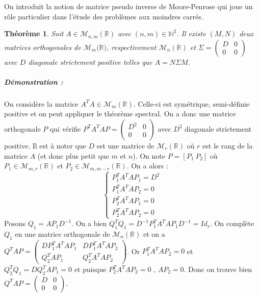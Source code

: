 \documentclass[10pt,a4paper]{article}
\newtheorem{thm}{Théorème}
\begin{document}
On introduit la notion de matrice pseudo inverse de Moore-Penrose \cite{penrose1955generalized} qui joue un rôle particulier dans l'étude des problèmes aux moindres carrés.
\begin{thm}
Soit $A \in \mathcal{M}_{n,m}(\mathbb{R})$ avec $(n,m) \in \mathbb{N}^2$.
Il existe $(M,N)$ deux matrices orthogonales de $\mathcal{M}_m(\mathbb{R)}$, respectivement $\mathcal{M}_n(\mathbb{R})$ et $\Sigma=\left( \begin{matrix}
D & 0 \\ 0 & 0
\end{matrix}\right)$ avec $D$ diagonale strictement positive telles que $A=N\Sigma M$.
\end{thm}
\subparagraph{Démonstration :} On considère la matrice $A^TA \in \mathcal{M}_{m}(\mathbb{R})$.
Celle-ci est symétrique, semi-définie positive et on peut appliquer le théorème spectral.
On a donc une matrice orthogonale $P$ qui vérifie $P^TA^TAP=\left( \begin{matrix}
D^2 & 0 \\ 0 & 0
\end{matrix} \right)$ avec $D^2$ diagonale strictement positive.
Il est à noter que $D$ est une matrice de $\mathcal{M}_r(\mathbb{R})$ où $r$ est le rang de la matrice $A$ (et donc plus petit que $m$ et $n$).
On note $P=[P_1 \ P_2]$ où $P_1 \in \mathcal{M}_{m,r}(\mathbb{R})$ et $P_2 \in \mathcal{M}_{m,m-r}(\mathbb{R})$.
On a alors :
\begin{equation}
\left\lbrace
\begin{aligned}
P_1^T A^T A P_1 = D^2 \\
P_1^T A^T A P_2 =0 \\
P_2^T A^T A P_1 =0 \\
P_2^T A^T A P_2 =0
\end{aligned}
\right.
\end{equation}
Posons $Q_1=A P_1 D^{-1}$.
On a bien
  $Q_1^T Q_1 = D^{-1} P_1^T A^T A P_1 D^{-1} = Id_r$.
On complète $Q_1$ en une matrice orthogonale de $\mathcal{M}_n(\mathbb{R})$ et on a
  $Q^T A P=
  \left( \begin{matrix}
    D P_1^T A^T A P_1 & D P_1^T A^T A P_2 \\
    Q_2^T A P_1 & Q_2^T A^T A P_2
  \end{matrix} \right)$.
Or
  $P_1^T A^T A P_2=0$
et
  $Q_2^T Q_1=D Q_2^T A P_1 =0$
et puisque
  $P_2^T A^T A P_2=0$
, $A P_2=0$.
Donc on trouve bien
  $Q^T A P =
    \left( \begin{matrix}
      D & 0 \\
      0 & 0
    \end{matrix}\right)$.\\
\end{document}
